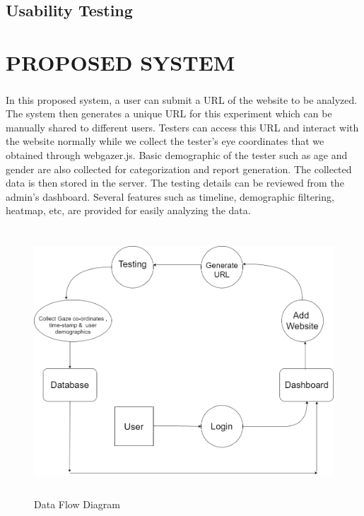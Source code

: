 \documentclass[12pt,a4paper,final]{extreport}
\begin{document}
\newpage
\section{Usability Testing}
\paragraph{}

\newpage
\chapter{ PROPOSED SYSTEM}
\paragraph{}
In this proposed system, a user can submit a URL of the website to be analyzed. The system
then generates a unique URL for this experiment which can be manually shared to different
users. Testers can access this URL and interact with the website normally while we collect
the tester’s eye coordinates that we obtained through webgazer.js. Basic demographic of the
tester such as age and gender are also collected for categorization and report generation. The
collected data is then stored in the server. The testing details can be reviewed from the admin’s
dashboard. Several features such as timeline, demographic filtering, heatmap, etc, are provided
for easily analyzing the data.

\begin{figure}[H]
\centering
\includegraphics[height=10cm,width=15cm]{DFD.png}
\caption{Data Flow Diagram}
\end{figure}
\end{document}
